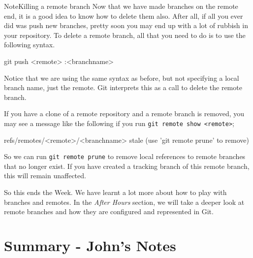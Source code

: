 \begin{callout}{Note}{Killing a remote branch}
Now that we have made branches on the remote end, it is a good idea to know how to delete them also.
After all, if all you ever did was push new branches, pretty soon you may end up with a lot of rubbish in your repository.
To delete a remote branch, all that you need to do is to use the following syntax.

\begin{code}
git push <remote> :<branchname>
\end{code}

Notice that we are using the same syntax as before, but not specifying a local branch name, just the remote.
Git interprets this as a call to delete the remote branch.

If you have a clone of a remote repository and a remote branch is removed, you may see a message like the following if you run \texttt{git remote show <remote>};

\begin{code}
 refs/remotes/<remote>/<branchname> stale (use 'git remote prune' to remove)
\end{code}

So we can run \texttt{git remote prune} to remove local references to remote branches that no longer exist.
If you have created a tracking branch of this remote branch, this will remain unaffected.
\end{callout}

So this ends the Week.
We have learnt a lot more about how to play with branches and remotes.
In the \emph{After Hours} section, we will take a deeper look at remote branches and how they are configured and represented in Git.

\clearpage

\section{Summary - John's Notes}
